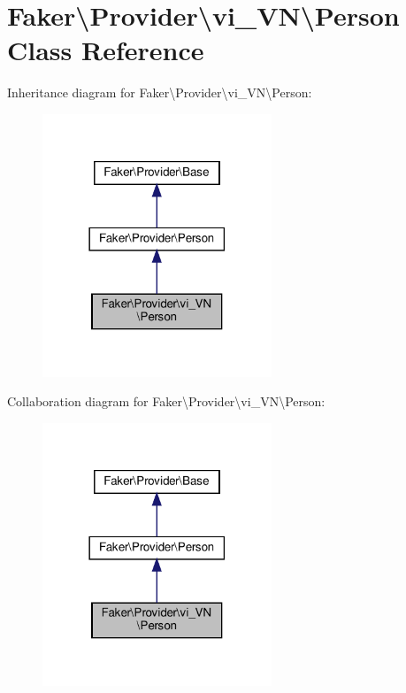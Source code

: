 \hypertarget{classFaker_1_1Provider_1_1vi__VN_1_1Person}{}\section{Faker\textbackslash{}Provider\textbackslash{}vi\+\_\+\+VN\textbackslash{}Person Class Reference}
\label{classFaker_1_1Provider_1_1vi__VN_1_1Person}


Inheritance diagram for Faker\textbackslash{}Provider\textbackslash{}vi\+\_\+\+VN\textbackslash{}Person\+:\nopagebreak
\begin{figure}[H]
\begin{center}
\leavevmode
\includegraphics[width=194pt]{classFaker_1_1Provider_1_1vi__VN_1_1Person__inherit__graph}
\end{center}
\end{figure}


Collaboration diagram for Faker\textbackslash{}Provider\textbackslash{}vi\+\_\+\+VN\textbackslash{}Person\+:\nopagebreak
\begin{figure}[H]
\begin{center}
\leavevmode
\includegraphics[width=194pt]{classFaker_1_1Provider_1_1vi__VN_1_1Person__coll__graph}
\end{center}
\end{figure}
